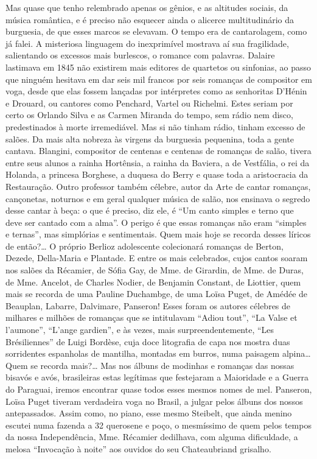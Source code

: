 Mas quase que tenho relembrado apenas os gênios, e as altitudes sociais,
da música romântica, e é preciso não esquecer ainda o alicerce
multitudinário da burguesia, de que esses marcos se elevavam. O tempo
era de cantarolagem, como já falei. A misteriosa linguagem do
inexprimível mostrava aí sua fragilidade, salientando os excessos mais
burlescos, o romance com palavras. Dalaire lastimava em 1845 não
existirem mais editores de quartetos ou sinfonias, ao passo que ninguém
hesitava em dar seis mil francos por seis romanças de compositor em
voga, desde que elas fossem lançadas por intérpretes como as senhoritas
D'Hénin e Drouard, ou cantores como Penchard, Vartel ou Richelmi. Estes
seriam por certo os Orlando Silva e as Carmen Miranda do tempo, sem
rádio nem disco, predestinados à morte irremediável. Mas si não tinham
rádio, tinham excesso de salões. Da mais alta nobreza às virgens da
burguesia pequenina, toda a gente cantava. Blangini, compositor de
centenas e centenas de romanças de salão, tivera entre seus alunos a
rainha Hortênsia, a rainha da Baviera, a de Vestfália, o rei da Holanda,
a princesa Borghese, a duquesa do Berry e quase toda a aristocracia da
Restauração. Outro professor também célebre, autor da Arte de cantar
romanças, cançonetas, noturnos e em geral qualquer música de salão, nos
ensinava o segredo desse cantar à beça: o que é preciso, diz ele, é ``Um
canto simples e terno que deve ser cantado com a alma''. O perigo é que
essas romanças não eram ``simples e ternas'', mas simplórias e
sentimentais. Quem mais hoje se recorda desses líricos de então?\ldots{} O
próprio Berlioz adolescente colecionará romanças de Berton, Dezede,
Della-Maria e Plantade. E entre os mais celebrados, cujos cantos soaram
nos salões da Récamier, de Sófia Gay, de Mme. de Girardin, de Mme. de
Duras, de Mme. Ancelot, de Charles Nodier, de Benjamin Constant, de
Liottier, quem mais se recorda de uma Pauline Duchambge, de uma Loïsa
Puget, de Amédée de Beauplan, Labarre, Dalvimare, Panseron! Esses foram
os autores célebres de milhares e milhões de romanças que se intitulavam
``Adiou tout'', ``La Valse et l'aumone'', ``L'ange gardien'', e às
vezes, mais surpreendentemente, ``Les Brésiliennes'' de Luigi Bordèse,
cuja doce litografia de capa nos mostra duas sorridentes espanholas de
mantilha, montadas em burros, numa paisagem alpina\ldots{} Quem se recorda
mais?\ldots{} Mas nos álbuns de modinhas e romanças das nossas bisavós e
avós, brasileiras estas legítimas que festejaram a Maioridade e a Guerra
do Paraguai, iremos encontrar quase todos esses mesmos nomes de mel.
Panseron, Loïsa Puget tiveram verdadeira voga no Brasil, a julgar pelos
álbuns dos nossos antepassados. Assim como, no piano, esse mesmo
Steibelt, que ainda menino escutei numa fazenda a 32 querosene e poço, o
mesmíssimo de quem pelos tempos da nossa Independência, Mme. Récamier
dedilhava, com alguma dificuldade, a melosa ``Invocação à noite'' aos
ouvidos do seu Chateaubriand grisalho.

